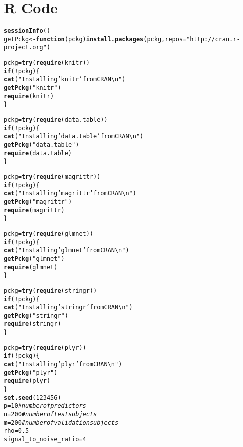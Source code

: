\documentclass[11pt,letter]{article}\usepackage[]{graphicx}\usepackage[]{color}
\makeatletter
\newcommand{\hlnum}[1]{\textcolor[rgb]{0.686,0.059,0.569}{#1}}%
\newcommand{\hlstr}[1]{\textcolor[rgb]{0.192,0.494,0.8}{#1}}%
\newcommand{\hlcom}[1]{\textcolor[rgb]{0.678,0.584,0.686}{\textit{#1}}}%
\newcommand{\hlopt}[1]{\textcolor[rgb]{0,0,0}{#1}}%
\newcommand{\hlstd}[1]{\textcolor[rgb]{0.345,0.345,0.345}{#1}}%
\newcommand{\hlkwa}[1]{\textcolor[rgb]{0.161,0.373,0.58}{\textbf{#1}}}%
\newcommand{\hlkwb}[1]{\textcolor[rgb]{0.69,0.353,0.396}{#1}}%
\newcommand{\hlkwc}[1]{\textcolor[rgb]{0.333,0.667,0.333}{#1}}%
\newcommand{\hlkwd}[1]{\textcolor[rgb]{0.737,0.353,0.396}{\textbf{#1}}}%
\newenvironment{kframe}{%
 \def\at@end@of@kframe{}%
 \ifinner\ifhmode%
  \def\at@end@of@kframe{\end{minipage}}%
  \begin{minipage}{\columnwidth}%
 \fi\fi%
 \def\FrameCommand##1{\hskip\@totalleftmargin \hskip-\fboxsep
 \colorbox{shadecolor}{##1}\hskip-\fboxsep
     \hskip-\linewidth \hskip-\@totalleftmargin \hskip\columnwidth}%
 \MakeFramed {\advance\hsize-\width
   \@totalleftmargin\z@ \linewidth\hsize
   \@setminipage}}%
 {\par\unskip\endMakeFramed%
 \at@end@of@kframe}
\newenvironment{knitrout}{}{} %
\makeatother
\begin{document}
\newpage



\newpage
\appendix

\section{R Code}
\begin{knitrout}
\color{fgcolor}\begin{kframe}
\begin{alltt}
\hlkwd{sessionInfo}\hlstd{()}
\hlstd{getPckg} \hlkwb{<-} \hlkwa{function}\hlstd{(}\hlkwc{pckg}\hlstd{)} \hlkwd{install.packages}\hlstd{(pckg,} \hlkwc{repos} \hlstd{=} \hlstr{"http://cran.r-project.org"}\hlstd{)}

\hlstd{pckg} \hlkwb{=} \hlkwd{try}\hlstd{(}\hlkwd{require}\hlstd{(knitr))}
\hlkwa{if} \hlstd{(}\hlopt{!}\hlstd{pckg) \{}
    \hlkwd{cat}\hlstd{(}\hlstr{"Installing 'knitr' from CRAN\textbackslash{}n"}\hlstd{)}
    \hlkwd{getPckg}\hlstd{(}\hlstr{"knitr"}\hlstd{)}
    \hlkwd{require}\hlstd{(knitr)}
\hlstd{\}}

\hlstd{pckg} \hlkwb{=} \hlkwd{try}\hlstd{(}\hlkwd{require}\hlstd{(data.table))}
\hlkwa{if} \hlstd{(}\hlopt{!}\hlstd{pckg) \{}
    \hlkwd{cat}\hlstd{(}\hlstr{"Installing 'data.table' from CRAN\textbackslash{}n"}\hlstd{)}
    \hlkwd{getPckg}\hlstd{(}\hlstr{"data.table"}\hlstd{)}
    \hlkwd{require}\hlstd{(data.table)}
\hlstd{\}}

\hlstd{pckg} \hlkwb{=} \hlkwd{try}\hlstd{(}\hlkwd{require}\hlstd{(magrittr))}
\hlkwa{if} \hlstd{(}\hlopt{!}\hlstd{pckg) \{}
    \hlkwd{cat}\hlstd{(}\hlstr{"Installing 'magrittr' from CRAN\textbackslash{}n"}\hlstd{)}
    \hlkwd{getPckg}\hlstd{(}\hlstr{"magrittr"}\hlstd{)}
    \hlkwd{require}\hlstd{(magrittr)}
\hlstd{\}}

\hlstd{pckg} \hlkwb{=} \hlkwd{try}\hlstd{(}\hlkwd{require}\hlstd{(glmnet))}
\hlkwa{if} \hlstd{(}\hlopt{!}\hlstd{pckg) \{}
    \hlkwd{cat}\hlstd{(}\hlstr{"Installing 'glmnet' from CRAN\textbackslash{}n"}\hlstd{)}
    \hlkwd{getPckg}\hlstd{(}\hlstr{"glmnet"}\hlstd{)}
    \hlkwd{require}\hlstd{(glmnet)}
\hlstd{\}}

\hlstd{pckg} \hlkwb{=} \hlkwd{try}\hlstd{(}\hlkwd{require}\hlstd{(stringr))}
\hlkwa{if} \hlstd{(}\hlopt{!}\hlstd{pckg) \{}
    \hlkwd{cat}\hlstd{(}\hlstr{"Installing 'stringr' from CRAN\textbackslash{}n"}\hlstd{)}
    \hlkwd{getPckg}\hlstd{(}\hlstr{"stringr"}\hlstd{)}
    \hlkwd{require}\hlstd{(stringr)}
\hlstd{\}}

\hlstd{pckg} \hlkwb{=} \hlkwd{try}\hlstd{(}\hlkwd{require}\hlstd{(plyr))}
\hlkwa{if} \hlstd{(}\hlopt{!}\hlstd{pckg) \{}
    \hlkwd{cat}\hlstd{(}\hlstr{"Installing 'plyr' from CRAN\textbackslash{}n"}\hlstd{)}
    \hlkwd{getPckg}\hlstd{(}\hlstr{"plyr"}\hlstd{)}
    \hlkwd{require}\hlstd{(plyr)}
\hlstd{\}}
\hlkwd{set.seed}\hlstd{(}\hlnum{123456}\hlstd{)}
\hlstd{p} \hlkwb{=} \hlnum{10}  \hlcom{# number of predictors}
\hlstd{n} \hlkwb{=} \hlnum{200}  \hlcom{# number of test subjects}
\hlstd{m} \hlkwb{=} \hlnum{200}  \hlcom{# number of validation subjects}
\hlstd{rho} \hlkwb{=} \hlnum{0.5}
\hlstd{signal_to_noise_ratio} \hlkwb{=} \hlnum{4}


\end{alltt}
\end{kframe}
\end{knitrout}
\end{document}
